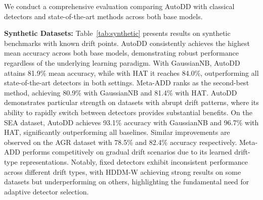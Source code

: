 \documentclass{article}
\begin{document}
We conduct a comprehensive evaluation comparing AutoDD with classical detectors and state-of-the-art methods across both base models.

\textbf{Synthetic Datasets:} Table~\ref{tab:synthetic} presents results on synthetic benchmarks with known drift points. AutoDD consistently achieves the highest mean accuracy across both base models, demonstrating robust performance regardless of the underlying learning paradigm. With GaussianNB, AutoDD attains 81.9\% mean accuracy, while with HAT it reaches 84.0\%, outperforming all state-of-the-art detectors in both settings. Meta-ADD ranks as the second-best method, achieving 80.9\% with GaussianNB and 81.4\% with HAT. AutoDD demonstrates particular strength on datasets with abrupt drift patterns, where its ability to rapidly switch between detectors provides substantial benefits. On the SEA dataset, AutoDD achieves 93.1\% accuracy with GaussianNB and 96.7\% with HAT, significantly outperforming all baselines. Similar improvements are observed on the AGR dataset with 78.5\% and 82.4\% accuracy respectively. Meta-ADD performs competitively on gradual drift scenarios due to its learned drift-type representations. Notably, fixed detectors exhibit inconsistent performance across different drift types, with HDDM-W achieving strong results on some datasets but underperforming on others, highlighting the fundamental need for adaptive detector selection.
\end{document}
